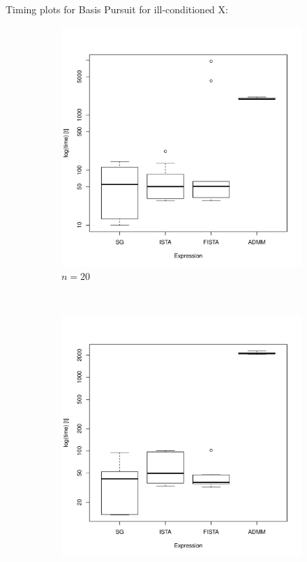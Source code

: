 \documentclass[xcolor=dvipsnames,aspectratio=1610]{beamer}
\theoremstyle{remark}
\begin{document}
\begin{frame}{Timing plots for Basis Pursuit for ill-conditioned X:}
\fontsize{6pt}{7.2}\selectfont
\begin{figure}[H]
  \centering
    \begin{subfigure}[b]{0.2\textwidth}
        \includegraphics[width=\textwidth]{20timing-cn.pdf}
        \caption{$n=20$}
        \label{fig:20}
    \end{subfigure}
~
    \begin{subfigure}[b]{0.2\textwidth}
        \includegraphics[width=\textwidth]{50timing-cn.pdf}

\end{subfigure}
\end{figure}
\end{frame}
\end{document}
